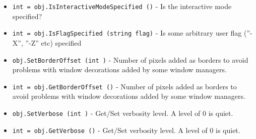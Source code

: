 \begin{itemize}
\item  \verb|int = obj.IsInteractiveModeSpecified ()| -  Is the interactive mode specified?

\item  \verb|int = obj.IsFlagSpecified (string flag)| -  Is some arbitrary user flag (''-X'', ''-Z'' etc) specified

\item  \verb|obj.SetBorderOffset (int )| -  Number of pixels added as borders to avoid problems with
 window decorations added by some window managers.

\item  \verb|int = obj.GetBorderOffset ()| -  Number of pixels added as borders to avoid problems with
 window decorations added by some window managers.

\item  \verb|obj.SetVerbose (int )| -  Get/Set verbosity level. A level of 0 is quiet.

\item  \verb|int = obj.GetVerbose ()| -  Get/Set verbosity level. A level of 0 is quiet.

\end{itemize}
